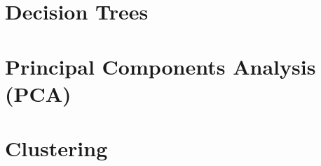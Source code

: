 \documentclass[english]{article}
\begin{document}
\begin{multicols*}{2}
\section{Decision Trees}


\newpage
\section{Principal Components Analysis (PCA)}\label{sec:PCA}


\newpage
\section{Clustering}





\end{multicols*}
\end{document}
